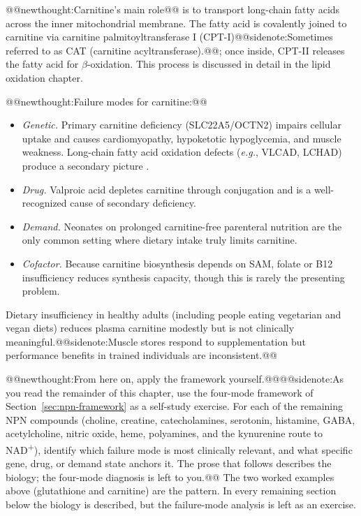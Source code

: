 \documentclass{tufte-handout}
\makeatletter
\def\newthought#1{@@newthought:#1@@}
\def\sidenote#1{@@sidenote:#1@@}
\makeatother
\begin{document}
\newthought{Carnitine's main role} is to transport long-chain fatty acids across the inner mitochondrial membrane. The fatty acid is covalently joined to carnitine via carnitine palmitoyltransferase I (CPT-I)\sidenote{Sometimes referred to as CAT (carnitine acyltransferase).}; once inside, CPT-II releases the fatty acid for $\beta$-oxidation. This process is discussed in detail in the lipid oxidation chapter.

\newthought{Failure modes for carnitine:}
\begin{itemize}
\item \emph{Genetic.} Primary carnitine deficiency (SLC22A5/OCTN2) impairs cellular uptake and causes cardiomyopathy, hypoketotic hypoglycemia, and muscle weakness. Long-chain fatty acid oxidation defects (\textit{e.g.}, VLCAD, LCHAD) produce a secondary picture \citep{longoCarnitineTransportFatty2016}.
\item \emph{Drug.} Valproic acid depletes carnitine through conjugation and is a well-recognized cause of secondary deficiency.
\item \emph{Demand.} Neonates on prolonged carnitine-free parenteral nutrition are the only common setting where dietary intake truly limits carnitine.
\item \emph{Cofactor.} Because carnitine biosynthesis depends on SAM, folate or B12 insufficiency reduces synthesis capacity, though this is rarely the presenting problem.
\end{itemize}
Dietary insufficiency in healthy adults (including people eating vegetarian and vegan diets) reduces plasma carnitine modestly but is not clinically meaningful.\sidenote{Muscle stores respond to supplementation but performance benefits in trained individuals are inconsistent.}

\newthought{From here on, apply the framework yourself.}\sidenote{As you read the remainder of this chapter, use the four-mode framework of Section~\ref{sec:npn-framework} as a self-study exercise. For each of the remaining NPN compounds (choline, creatine, catecholamines, serotonin, histamine, GABA, acetylcholine, nitric oxide, heme, polyamines, and the kynurenine route to NAD\textsuperscript{+}), identify which failure mode is most clinically relevant, and what specific gene, drug, or demand state anchors it. The prose that follows describes the biology; the four-mode diagnosis is left to you.} The two worked examples above (glutathione and carnitine) are the pattern. In every remaining section below the biology is described, but the failure-mode analysis is left as an exercise.
\end{document}
